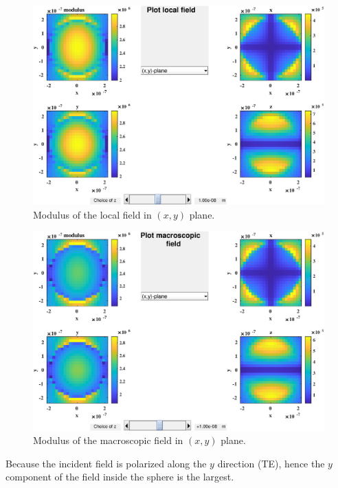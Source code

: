 \begin{figure}[H]
\begin{center}
  \includegraphics*[width=15.0cm,draft=false]{test1local.eps}
\end{center}
\caption{Modulus of the local field in $(x,y)$ plane.}
\end{figure}
\begin{figure}[H]
\begin{center}
  \includegraphics*[width=15.0cm,draft=false]{test1macro.eps}
\end{center}
\caption{Modulus of the macroscopic field in $(x,y)$ plane.}
\end{figure}
Because the incident field is polarized along the $y$ direction (TE),
hence the $y$ component of the field inside the sphere is the largest.


